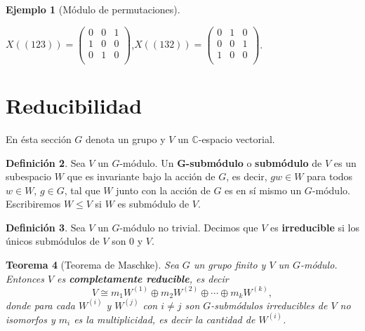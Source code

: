 \documentclass[12pt]{book}
\newtheorem{theorem}{Teorema}[section]
\theoremstyle{definition}
\newtheorem{definition}[theorem]{Definición}
\newtheorem{example}[theorem]{Ejemplo}
\newcounter{in}
\newcounter{ini}
\begin{document}
\begin{example}[Módulo de permutaciones]
  \begin{center}
    $X((123))=\begin{pmatrix}
      0 & 0 & 1 \\
      1 & 0 & 0 \\
      0 & 1 & 0 \\
    \end{pmatrix}$,\quad $X((132))=\begin{pmatrix}
      0 & 1 & 0 \\
      0 & 0 & 1 \\
      1 & 0 & 0 \\
    \end{pmatrix}$.
  \end{center}
\end{example}

\section{Reducibilidad}
\label{reducibilidad}

En ésta sección $G$ denota un grupo y $V$ un $\mathbb{C}$-espacio vectorial.

\begin{definition}
  Sea $V$ un $G$-módulo. Un $\boldsymbol{G}$\textbf{-submódulo} o \textbf{submódulo} de $V$ es un subespacio
  $W$ que es invariante bajo la acción de $G$, es decir, $ gw\in W$
  para todos $w\in W$, $g\in G$, tal que $W$ junto con la acción de
  $G$ es en sí mismo un $G$-módulo. Escribiremos $W\leq V$ si $W$ es
  submódulo de $V$. 
\end{definition}

\begin{definition}
  Sea $V$ un $G$-módulo no trivial. Decimos que $V$ es \textbf{irreducible} si
  los únicos submódulos de $V$ son $0$ y $V$.
\end{definition}


\begin{theorem}[Teorema de Maschke]
  \label{maschke}
  Sea $G$ un grupo finito y $V$ un $G$-módulo. Entonces $V$ es
  \textbf{completamente reducible}, es decir
  \begin{equation*}
    V\cong m_{1}W^{(1)}\oplus m_{2}W^{(2)}\oplus\cdots \oplus m_{k}W^{(k)},
  \end{equation*}
donde para cada $W^{(i)}$ y $W^{(j)}$ con $i\neq j$ son $G$-submódulos
irreducibles de $V$ no isomorfos y $m_{i}$ es la multiplicidad, es
decir la cantidad de $W^{(i)}$.
\end{theorem}
\end{document}
